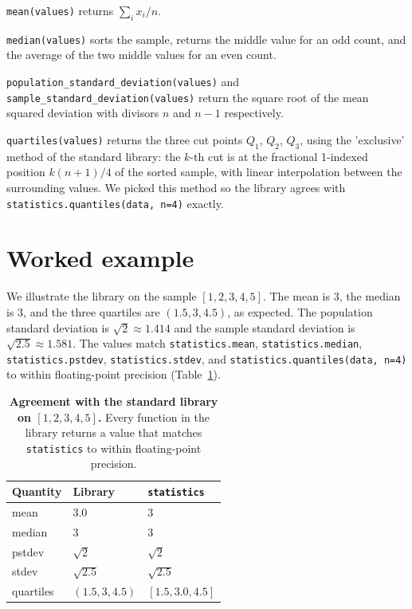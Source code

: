 \documentclass[11pt]{article}
\begin{document}
\texttt{mean(values)} returns
\(\sum_i x_i / n\).

\texttt{median(values)} sorts the sample,
returns the middle value for an odd count, and the average of the
two middle values for an even count.

\texttt{population\_standard\_deviation(values)} and
\texttt{sample\_standard\_deviation(values)} return the square root
of the mean squared deviation with divisors \(n\) and \(n - 1\)
respectively.

\texttt{quartiles(values)} returns the three
cut points \(Q_1\), \(Q_2\), \(Q_3\), using the 'exclusive' method
of the standard library: the \(k\)-th cut is at the fractional
1-indexed position \(k (n + 1) / 4\) of the sorted sample, with
linear interpolation between the surrounding values. We picked this
method so the library agrees with \texttt{statistics.quantiles(data,
n=4)} exactly.

\section{Worked example}

We illustrate the library on the sample \([1, 2, 3, 4, 5]\). The
mean is \(3\), the median is \(3\), and the three quartiles are
\((1.5, 3, 4.5)\), as expected. The population standard deviation is
\(\sqrt{2} \approx 1.414\) and the sample standard deviation is
\(\sqrt{2.5} \approx 1.581\). The values match
\texttt{statistics.mean}, \texttt{statistics.median},
\texttt{statistics.pstdev}, \texttt{statistics.stdev}, and
\texttt{statistics.quantiles(data, n=4)} to within floating-point
precision (Table~\ref{tab:demo}).

\begin{table}[h]
\centering
\begin{tabular}{l l l}
\toprule
Quantity & Library & \texttt{statistics} \\
\midrule
mean    & \(3.0\)              & \(3\) \\
median  & \(3\)                & \(3\) \\
pstdev  & \(\sqrt{2}\)         & \(\sqrt{2}\) \\
stdev   & \(\sqrt{2.5}\)       & \(\sqrt{2.5}\) \\
quartiles & \((1.5, 3, 4.5)\)  & \([1.5, 3.0, 4.5]\) \\
\bottomrule
\end{tabular}
\caption{\textbf{Agreement with the standard library on
\([1, 2, 3, 4, 5]\).} Every function in the library returns a value
that matches \texttt{statistics} to within floating-point
precision.}
\label{tab:demo}
\end{table}
\end{document}
